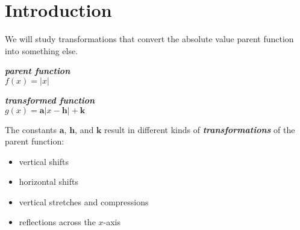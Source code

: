 \section{Introduction}

We will study transformations that convert the absolute value parent function into something else.

\begin{tcbraster}[
    raster equal height,
    raster left skip = 1in, raster right skip = 1in, 
    raster column skip = 0.5in,
    raster before skip = 1.5\baselineskip, raster after skip = 1.5\baselineskip,
    ]
    \begin{tcolorbox}[]
        \centering
        {\bfseries\itshape parent function}\\[0.5\baselineskip]
        \large
        $f(x) = |x|$
    \end{tcolorbox}
    \begin{tcolorbox}[]
        \centering
        {\bfseries\itshape transformed function}\\[0.5\baselineskip]
        \large
        $g(x) = \bm{a} | x-\bm{h} | + \bm{k}$
    \end{tcolorbox}
\end{tcbraster}

\begin{tcbraster}[]
\end{tcbraster}


The constants {$\bm{a}$}, {$\bm{h}$}, and {$\bm{k}$} result in 
different kinds of {\bfseries\itshape transformations} 
of the parent function:
\begin{itemize}[nosep]
    \item vertical shifts
    \item horizontal shifts
    \item vertical stretches and compressions
    \item reflections across the $x$-axis
\end{itemize}
